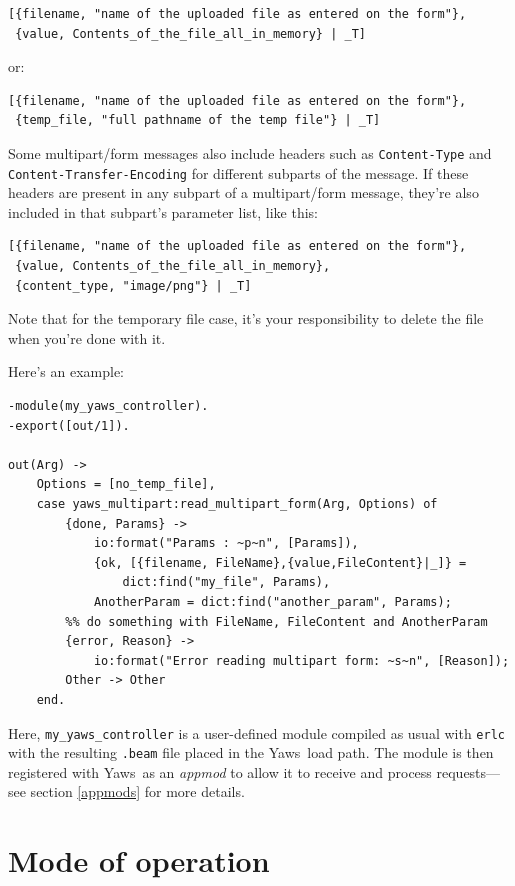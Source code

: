 \documentclass[11pt,oneside,english]{book}
\newcommand{\Yaws}            %
        {{\sc Yaws}}
\begin{document}
\begin{verbatim}
[{filename, "name of the uploaded file as entered on the form"},
 {value, Contents_of_the_file_all_in_memory} | _T]
\end{verbatim}

or:

\begin{verbatim}
[{filename, "name of the uploaded file as entered on the form"},
 {temp_file, "full pathname of the temp file"} | _T]
\end{verbatim}

Some multipart/form messages also include headers such as
\verb+Content-Type+ and \verb+Content-Transfer-Encoding+ for different
subparts of the message. If these headers are present in any subpart
of a multipart/form message, they're also included in that subpart's
parameter list, like this:

\begin{verbatim}
[{filename, "name of the uploaded file as entered on the form"},
 {value, Contents_of_the_file_all_in_memory},
 {content_type, "image/png"} | _T]
\end{verbatim}

Note that for the temporary file case, it's your responsibility to
delete the file when you're done with it.

Here's an example:

\begin{verbatim}
-module(my_yaws_controller).
-export([out/1]).

out(Arg) ->
    Options = [no_temp_file],
    case yaws_multipart:read_multipart_form(Arg, Options) of
        {done, Params} ->
            io:format("Params : ~p~n", [Params]),
            {ok, [{filename, FileName},{value,FileContent}|_]} =
                dict:find("my_file", Params),
            AnotherParam = dict:find("another_param", Params);
        %% do something with FileName, FileContent and AnotherParam
        {error, Reason} ->
            io:format("Error reading multipart form: ~s~n", [Reason]);
        Other -> Other
    end.
\end{verbatim}

Here, \verb+my_yaws_controller+ is a user-defined module compiled as
usual with \verb+erlc+ with the resulting \verb+.beam+ file placed in
the \Yaws\ load path. The module is then registered with \Yaws\ as an
\emph{appmod} to allow it to receive and process requests---see
section \ref{appmods} for more details.

\chapter{Mode of operation}
\end{document}
